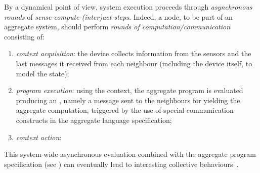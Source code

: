 %
%
%

%
%
By a dynamical point of view, 
 system execution proceeds
 through \emph{asynchronous rounds}
 of \emph{sense-compute-(inter)act steps}.
%
Indeed, a node, to be part of an aggregate system, should %
perform \emph{rounds of computation/communication} consisting of:
\begin{enumerate}
    \item \emph{context acquisition}: the device collects information 
     from the sensors and the last messages it received 
     from each neighbour (including the device itself, to model the state);
    \item \emph{program execution}: using the context, 
    the aggregate program is evaluated producing an \emph{\export{}},
    namely a message sent to the neighbours for yielding the aggregate computation, 
    triggered by the use of special communication constructs in the aggregate language specification;
    \item \emph{context action}: 
  \end{enumerate}
%
This system-wide asynchronous evaluation
 combined with the aggregate program specification (see )
 can eventually lead to interesting collective behaviours~\cite{DBLP:journals/jlap/ViroliBDACP19}. 
 
%

